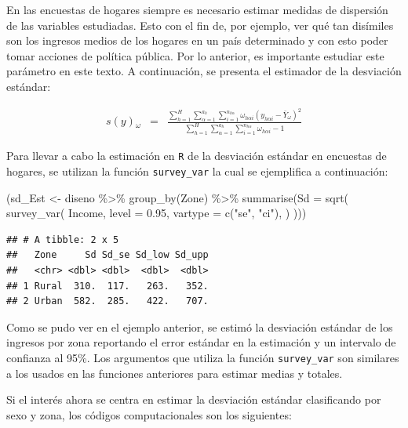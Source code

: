 \documentclass[
  12pt,
]{book}
\newenvironment{Shaded}{\begin{snugshade}}{\end{snugshade}}
\newcommand{\AttributeTok}[1]{\textcolor[rgb]{0.77,0.63,0.00}{#1}}
\newcommand{\FloatTok}[1]{\textcolor[rgb]{0.00,0.00,0.81}{#1}}
\newcommand{\FunctionTok}[1]{\textcolor[rgb]{0.00,0.00,0.00}{#1}}
\newcommand{\NormalTok}[1]{#1}
\newcommand{\OtherTok}[1]{\textcolor[rgb]{0.56,0.35,0.01}{#1}}
\newcommand{\SpecialCharTok}[1]{\textcolor[rgb]{0.00,0.00,0.00}{#1}}
\newcommand{\StringTok}[1]{\textcolor[rgb]{0.31,0.60,0.02}{#1}}
\begin{document}
En las encuestas de hogares siempre es necesario estimar medidas de dispersión de las variables estudiadas. Esto con el fin de, por ejemplo, ver qué tan disímiles son los ingresos medios de los hogares en un país determinado y con esto poder tomar acciones de política pública. Por lo anterior, es importante estudiar este parámetro en este texto. A continuación, se presenta el estimador de la desviación estándar:

\begin{eqnarray}
s\left(y\right){}_{\omega} & = & \frac{\sum_{h=1}^{H}\sum_{\alpha=1}^{a_{h}}\sum_{i=1}^{n_{h\alpha}}\omega_{h\alpha i}\left(y_{h\alpha i}-\bar{Y}_{\omega}\right)^{2}}{\sum_{h=1}^{H}\sum_{\alpha=1}^{a_{h}}\sum_{i=1}^{n_{h\alpha}}\omega_{h\alpha i}-1}
\end{eqnarray}

Para llevar a cabo la estimación en \texttt{R} de la desviación estándar en encuestas de hogares, se utilizan la función \texttt{survey\_var} la cual se ejemplifica a continuación:

\begin{Shaded}
\begin{Highlighting}[]
\NormalTok{(sd\_Est }\OtherTok{\textless{}{-}}\NormalTok{ diseno }\SpecialCharTok{\%\textgreater{}\%} \FunctionTok{group\_by}\NormalTok{(Zone) }\SpecialCharTok{\%\textgreater{}\%} 
   \FunctionTok{summarise}\NormalTok{(}\AttributeTok{Sd =} \FunctionTok{sqrt}\NormalTok{(}
  \FunctionTok{survey\_var}\NormalTok{(}
\NormalTok{    Income,}
    \AttributeTok{level =} \FloatTok{0.95}\NormalTok{,}
    \AttributeTok{vartype =}  \FunctionTok{c}\NormalTok{(}\StringTok{"se"}\NormalTok{, }\StringTok{"ci"}\NormalTok{),}
\NormalTok{  ) )))}
\end{Highlighting}
\end{Shaded}

\begin{verbatim}
## # A tibble: 2 x 5
##   Zone     Sd Sd_se Sd_low Sd_upp
##   <chr> <dbl> <dbl>  <dbl>  <dbl>
## 1 Rural  310.  117.   263.   352.
## 2 Urban  582.  285.   422.   707.
\end{verbatim}

Como se pudo ver en el ejemplo anterior, se estimó la desviación estándar de los ingresos por zona reportando el error estándar en la estimación y un intervalo de confianza al 95\%. Los argumentos que utiliza la función \texttt{survey\_var} son similares a los usados en las funciones anteriores para estimar medias y totales.

Si el interés ahora se centra en estimar la desviación estándar clasificando por sexo y zona, los códigos computacionales son los siguientes:
\end{document}
